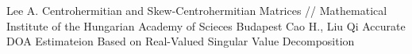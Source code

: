 \begin{thebibliography}{1}
     Lee A. Centrohermitian and Skew-Centrohermitian Matrices //
        Mathematical Institute of the Hungarian Academy of Scieces Budapest
     Cao H., Liu Qi Accurate DOA Estimateion Based on Real-Valued Singular Value Decomposition
\end{thebibliography}